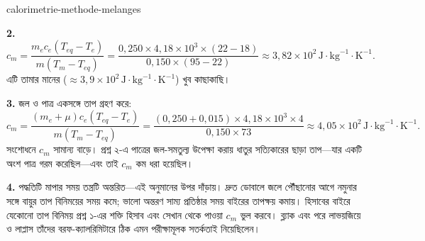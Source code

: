 \begin{exo}{calorimetrie-methode-melanges}
\begin{solution}
\textbf{2.}
\[
c_m=\frac{m_ec_e(T_{eq}-T_e)}{m(T_m-T_{eq})}
=\frac{0{,}250\times4{,}18\times10^3\times(22-18)}{0{,}150\times(95-22)}
\approx3{,}82\times10^2\,\text{J}\!\cdot\!\text{kg}^{-1}\!\cdot\!\text{K}^{-1}.
\]
এটি তামার মানের ($\approx3{,}9\times10^2\,\text{J}\!\cdot\!\text{kg}^{-1}\!\cdot\!\text{K}^{-1}$) খুব কাছাকাছি।

\textbf{3.} জল ও পাত্র একসঙ্গে তাপ গ্রহণ করে:
\[
c_m=\frac{(m_e+\mu)c_e(T_{eq}-T_e)}{m(T_m-T_{eq})}
=\frac{(0{,}250+0{,}015)\times4{,}18\times10^3\times4}{0{,}150\times73}
\approx4{,}05\times10^2\,\text{J}\!\cdot\!\text{kg}^{-1}\!\cdot\!\text{K}^{-1}.
\]
সংশোধনে $c_m$ সামান্য বাড়ে। প্রশ্ন ২-এ পাত্রের জল-সমতুল্য উপেক্ষা করায় ধাতুর সত্যিকারের ছাড়া তাপ—যার একটি অংশ পাত্র গরম করেছিল—এবং তাই $c_m$ কম ধরা হয়েছিল।

\textbf{4.} পদ্ধতিটি মাপার সময় তন্ত্রটি অন্তরিত—এই অনুমানের উপর দাঁড়ায়। দ্রুত ডোবালে জলে পৌঁছানোর আগে নমুনার সঙ্গে বায়ুর তাপ বিনিময়ের সময় কমে; ভালো অন্তরণ সাম্য প্রতিষ্ঠার সময় বাইরের তাপক্ষয় কমায়। হিসাবের বাইরে যেকোনো তাপ বিনিময় প্রশ্ন ১-এর শক্তি হিসাব এবং সেখান থেকে পাওয়া $c_m$ ভুল করবে। ব্ল্যাক এবং পরে লাভয়জিয়ে ও লাপ্লাস তাঁদের বরফ-ক্যালরিমিটারে ঠিক এমন পরীক্ষামূলক সতর্কতাই নিয়েছিলেন।
\end{solution}
\end{exo}

